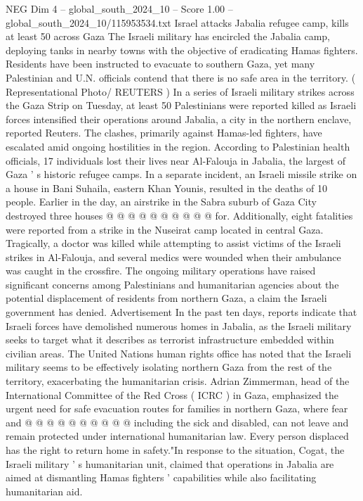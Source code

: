 \begin{textsample}{NEG Dim 4 – global\_south\_2024\_10 – Score 1.00 – global\_south\_2024\_10/115953534.txt}  \label{ex:f4_neg_065}
Israel attacks Jabalia refugee camp, kills at least 50 across Gaza The Israeli military has encircled the Jabalia camp, deploying tanks in nearby towns with the objective of eradicating Hamas fighters.
Residents have been instructed to evacuate to southern Gaza, yet many Palestinian and U.N. officials contend that there is no safe area in the territory. ( Representational Photo/ REUTERS ) In a series of Israeli military strikes across the Gaza Strip on Tuesday, at least 50 Palestinians were reported killed as Israeli forces intensified their operations around Jabalia, a city in the northern enclave, reported Reuters.
The clashes, primarily against Hamas-led fighters, have escalated amid ongoing hostilities in the region.
According to Palestinian health officials, 17 individuals lost their lives near Al-Falouja in Jabalia, the largest of Gaza ' s historic refugee camps.
In a separate incident, an Israeli missile strike on a house in Bani Suhaila, eastern Khan Younis, resulted in the deaths of 10 people.
Earlier in the day, an airstrike in the Sabra suburb of Gaza City destroyed three houses @ @ @ @ @ @ @ @ @ @ for.
Additionally, eight fatalities were reported from a strike in the Nuseirat camp located in central Gaza.
Tragically, a doctor was killed while attempting to assist victims of the Israeli strikes in Al-Falouja, and several medics were wounded when their ambulance was caught in the crossfire.
The ongoing military operations have raised significant concerns among Palestinians and humanitarian agencies about the potential displacement of residents from northern Gaza, a claim the Israeli government has denied.
Advertisement In the past ten days, reports indicate that Israeli forces have demolished numerous homes in Jabalia, as the Israeli military seeks to target what it describes as terrorist infrastructure embedded within civilian areas.
The United Nations human rights office has noted that the Israeli military seems to be effectively isolating northern Gaza from the rest of the territory, exacerbating the humanitarian crisis.
Adrian Zimmerman, head of the International Committee of the Red Cross ( ICRC ) in Gaza, emphasized the urgent need for safe evacuation routes for families in northern Gaza, where fear and @ @ @ @ @ @ @ @ @ @ including the sick and disabled, can not leave and remain protected under international humanitarian law.
Every person displaced has the right to return home in safety."In response to the situation, Cogat, the Israeli military ' s humanitarian unit, claimed that operations in Jabalia are aimed at dismantling Hamas fighters ' capabilities while also facilitating humanitarian aid.

\end{textsample}
